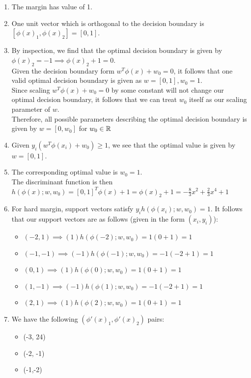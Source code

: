 \documentclass[submit]{harvardml}
\begin{document}
\begin{enumerate}
    \item The margin has value of 1.
    \item One unit vector which is orthogonal to the decision boundary is $[\phi(x)_1, \phi(x)_2] = [0, 1]$. 
    \item By inspection, we find that the optimal decision boundary is given by $\phi(x)_2 = -1 \implies \phi(x)_2 + 1 = 0$. \\
    Given the decision boundary form $w^T \phi(x) + w_0 = 0$, it follows that one valid optimal decision boundary is given as $w = [0, 1], w_0 = 1$. \\
    Since scaling $w^T \phi(x) + w_0 = 0$ by some constant will not change our optimal decision boundary, it follows that we can treat $w_0$ itself as our scaling parameter of $w$. \\
    Therefore, all possible parameters describing the optimal decision boundary is given by $w = [0, w_0]$ for $w_0 \in \mathbb{R}$
    \item Given $y_i(w^T\phi(x_i) + w_0) \geq 1$, we see that the optimal value is given by $w = [0,1]$. 
    \item The corresponding optimal value is $w_0 = 1$. \\
    The discriminant function is then $h(\phi(x); w, w_0)  = [0, 1]^T\phi(x) + 1 = \phi(x)_2 + 1 = - \frac{8}{3}x^2 + \frac{2}{3}x^4 + 1$
    \item For hard margin, support vectors satisfy $y_i h(\phi(x_i); w, w_0) = 1$. It follows that our support vectors are as follows (given in the form $(x_i, y_i)$):
    \begin{itemize}
        \item $(-2,1) \implies (1)h(\phi(-2); w, w_0) = 1(0+1) = 1$
        \item $(-1,-1) \implies (-1)h(\phi(-1); w, w_0) = -1(-2+1) = 1$
        \item $(0,1) \implies (1)h(\phi(0); w, w_0) = 1(0+1) = 1$
        \item $(1,-1) \implies (-1)h(\phi(1); w, w_0) = -1(-2+1) = 1$
        \item $(2,1) \implies (1)h(\phi(2); w, w_0) = 1(0+1) = 1$
    \end{itemize}
    \item  We have the following $(\phi'(x)_1, \phi'(x)_2)$ pairs:
    \begin{itemize}
        \item (-3, 24)
        \item (-2, -1)
        \item (-1,-2)

\end{itemize}
\end{enumerate}
\end{document}
